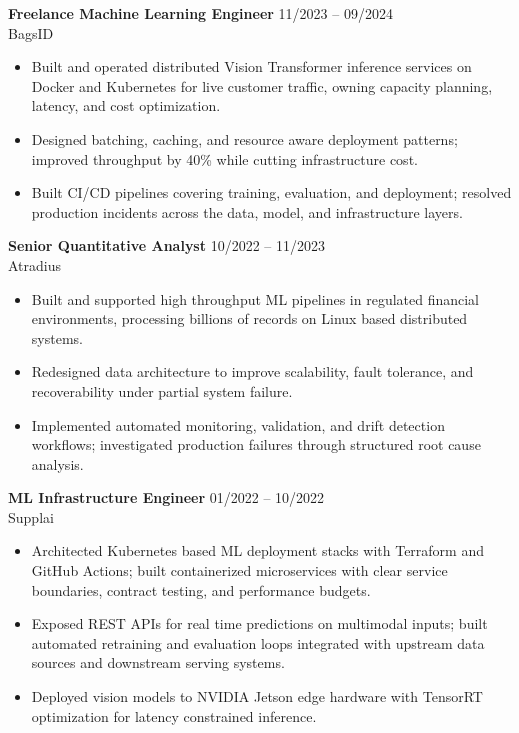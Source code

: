 \documentclass[a4paper,10pt]{article}
\newcommand{\entrygap}{\vspace{5pt}\Needspace*{4\baselineskip}}
\begin{document}
\entrygap
\textbf{Freelance Machine Learning Engineer} \hfill 11/2023 -- 09/2024 \\
BagsID
\begin{itemize}
    \item Built and operated distributed Vision Transformer inference services on Docker and Kubernetes for live customer traffic, owning capacity planning, latency, and cost optimization.
    \item Designed batching, caching, and resource aware deployment patterns; improved throughput by 40\% while cutting infrastructure cost.
    \item Built CI/CD pipelines covering training, evaluation, and deployment; resolved production incidents across the data, model, and infrastructure layers.
\end{itemize}

\entrygap
\textbf{Senior Quantitative Analyst} \hfill 10/2022 -- 11/2023 \\
Atradius
\begin{itemize}
    \item Built and supported high throughput ML pipelines in regulated financial environments, processing billions of records on Linux based distributed systems.
    \item Redesigned data architecture to improve scalability, fault tolerance, and recoverability under partial system failure.
    \item Implemented automated monitoring, validation, and drift detection workflows; investigated production failures through structured root cause analysis.
\end{itemize}

\entrygap
\textbf{ML Infrastructure Engineer} \hfill 01/2022 -- 10/2022 \\
Supplai
\begin{itemize}
    \item Architected Kubernetes based ML deployment stacks with Terraform and GitHub Actions; built containerized microservices with clear service boundaries, contract testing, and performance budgets.
    \item Exposed REST APIs for real time predictions on multimodal inputs; built automated retraining and evaluation loops integrated with upstream data sources and downstream serving systems.
    \item Deployed vision models to NVIDIA Jetson edge hardware with TensorRT optimization for latency constrained inference.
\end{itemize}
\end{document}
